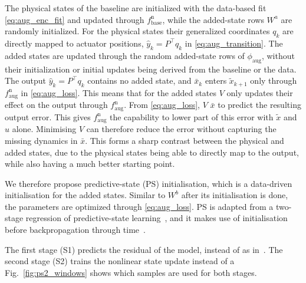 The physical states of the baseline are initialized with the 
data-based fit \eqref{eq:aug_enc_fit} and updated through
$f^{\mathrm n}_{\mathrm{base}}$, while the added-state rows $W^a$ are randomly initialized.
For the physical states their generalized coordinates $q_k$ are directly mapped to 
actuator positions, $\hat y_k=P^\top q_k$ in \eqref{eq:aug_transition}.
The added states are updated through the random added-state rows of $\phi_{\mathrm{aug}}$, 
without their initialization or initial updates being derived from the baseline or the data.
The output $\hat y_k=P^\top q_k$ contains no added state, and $\bar x_k$
enters $\tilde x_{k+1}$ only through $f^{\mathrm n}_{\mathrm{aug}}$ in
\eqref{eq:aug_loss}. This means that for the added states $V$ only updates their effect on 
the output through $f^{\mathrm n}_{\mathrm{aug}}$.
From \eqref{eq:aug_loss}, $V$  $\bar x$
to predict the resulting output error.
This gives $f^{\mathrm n}_{\mathrm{aug}}$ the capability to lower part of this error with 
$\tilde x$ and $\hat u$ alone.
Minimising $V$ can therefore reduce the error without capturing the missing
dynamics in $\bar x$. 
This forms a sharp contrast between the physical and added states,
due to the physical states being able to directly map to the output, 
while also having a much better starting point.



We therefore propose predictive-state (PS) initialisation, which is
a data-driven initialisation for the added states. 
Similar to $W^b$ after its initialisation is done, 
the parameters are optimized through \eqref{eq:aug_loss}.
PS is adapted from a two-stage regression of predictive-state
learning~\cite[Sec.~2]{hefny2015supervised}, and it makes use of initialisation
before backpropagation through time~\cite[Sec.~4.2]{downey2017psrnn}.

The first stage (S1) predicts the residual of the model, instead 
of  as in~\cite{hefny2015supervised}.
The second stage (S2) trains the nonlinear state update
instead of a 
Fig.~\ref{fig:ps2_windows} shows which samples
are used for both stages.

